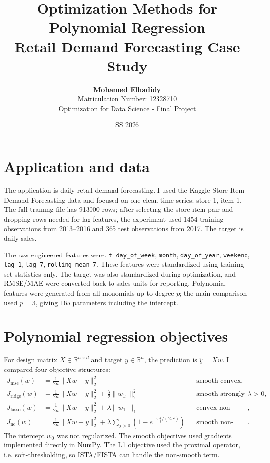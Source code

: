 \documentclass[10pt,a4paper]{article}
\title{\textbf{Optimization Methods for Polynomial Regression}\\\large Retail Demand Forecasting Case Study}
\author{\begin{tabular}{c}\textbf{Mohamed Elhadidy}\\ Matriculation Number: 12328710\\ Optimization for Data Science - Final Project\end{tabular}}
\date{SS 2026}
\begin{document}
\maketitle
\thispagestyle{plain}

\begin{center}
\end{center}

\section{Application and data}
The application is daily retail demand forecasting. I used the Kaggle Store Item Demand Forecasting data and focused on one clean time series: store 1, item 1. The full training file has 913000 rows; after selecting the store-item pair and dropping rows needed for lag features, the experiment used 1454 training observations from 2013--2016 and 365 test observations from 2017. The target is daily sales.

The raw engineered features were: \texttt{t}, \texttt{day\_of\_week}, \texttt{month}, \texttt{day\_of\_year}, \texttt{weekend}, \texttt{lag\_1}, \texttt{lag\_7}, \texttt{rolling\_mean\_7}. These features were standardized using training-set statistics only. The target was also standardized during optimization, and RMSE/MAE were converted back to sales units for reporting. Polynomial features were generated from all monomials up to degree $p$; the main comparison used $p=3$, giving 165 parameters including the intercept.

\section{Polynomial regression objectives}
For design matrix $X\in\mathbb{R}^{n\times d}$ and target $y\in\mathbb{R}^n$, the prediction is $\hat y=Xw$. I compared four objective structures:
\begin{align*}
J_{\mathrm{mse}}(w) &= \frac{1}{2n}\|Xw-y\|_2^2 && \text{smooth convex},\\
J_{\mathrm{ridge}}(w) &= \frac{1}{2n}\|Xw-y\|_2^2 + \frac{\lambda}{2}\|w_{1:}\|_2^2 && \text{smooth strongly convex for }\lambda>0,\\
J_{\mathrm{lasso}}(w) &= \frac{1}{2n}\|Xw-y\|_2^2 + \lambda\|w_{1:}\|_1 && \text{convex non-smooth},\\
J_{\mathrm{nc}}(w) &= \frac{1}{2n}\|Xw-y\|_2^2 + \lambda\sum_{j>0}\left(1-e^{-w_j^2/(2\tau^2)}\right) && \text{smooth non-convex}.
\end{align*}
The intercept $w_0$ was not regularized. The smooth objectives used gradients implemented directly in NumPy. The L1 objective used the proximal operator, i.e. soft-thresholding, so ISTA/FISTA can handle the non-smooth term.
\end{document}
